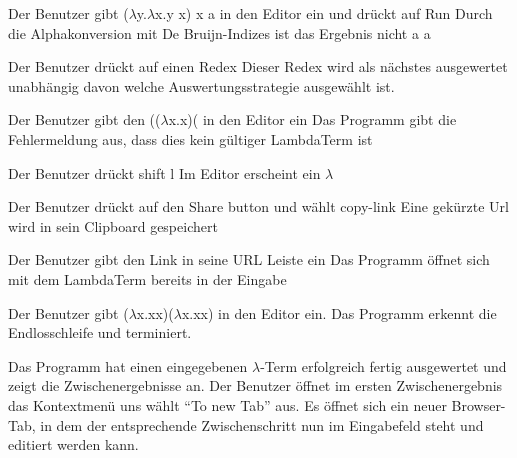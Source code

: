 \documentclass[parskip=full,11pt,twoside]{scrartcl}
\begin{document}
{ Der Benutzer gibt ($\lambda$y.$\lambda$x.y x) x a in den Editor ein und drückt auf Run}
{ Durch die Alphakonversion mit De Bruijn-Indizes ist das Ergebnis nicht a  a  }

 { Der Benutzer drückt auf einen Redex}
{ Dieser Redex wird als nächstes ausgewertet unabhängig davon welche Auswertungsstrategie ausgewählt ist. }

{ Der Benutzer gibt den (($\lambda$x.x)( in den Editor ein }
{ Das Programm gibt die Fehlermeldung aus, dass dies kein gültiger LambdaTerm ist }

{ Der Benutzer drückt shift l }
{Im Editor erscheint ein $\lambda$}

{ Der Benutzer drückt auf den Share button und wählt copy-link}
{ Eine gekürzte Url wird in sein Clipboard gespeichert }

{Der Benutzer gibt den Link in seine URL Leiste ein }
{ Das Programm öffnet sich mit dem LambdaTerm bereits in der Eingabe }



{Der Benutzer gibt ($\lambda$x.xx)($\lambda$x.xx) in den Editor ein.}
{Das Programm erkennt die Endlosschleife und terminiert.}



\teststep
{Das Programm hat einen eingegebenen $\lambda$-Term erfolgreich fertig ausgewertet und zeigt die Zwischenergebnisse an.}
{Der Benutzer öffnet im ersten Zwischenergebnis das Kontextmenü uns wählt \enquote{To new Tab} aus.}
{Es öffnet sich ein neuer Browser-Tab, in dem der entsprechende Zwischenschritt nun im Eingabefeld steht und editiert werden kann.}





\newpage
\end{document}
